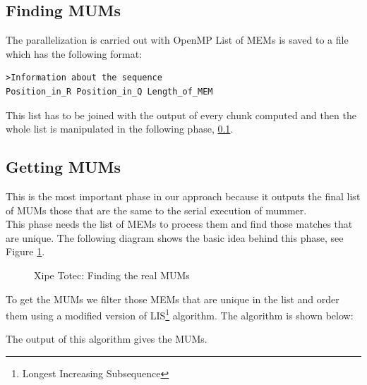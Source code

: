 \documentclass[3p,times]{elsarticle}
\begin{document}
\subsection*{Finding MUMs}
The parallelization is carried out with OpenMP 
List of MEMs is saved to a file which has the following format:
\begin{verbatim}
>Information about the sequence
Position_in_R Position_in_Q Length_of_MEM
\end{verbatim}
This list has to be joined with the output of every chunk computed and then the whole list is  manipulated in the following phase, \ref{getting}.
\subsection{Getting MUMs}
\label{getting}
This is the most important phase in our approach because it outputs the final list of MUMs those that are the same to the serial execution of mummer.\\
This phase needs the list of MEMs to process them and find those matches that are unique. The following diagram shows the basic idea behind this phase, see Figure \ref{xt}.
\begin{figure}[htb]  
 \begin{center} 
 \end{center} 
 \caption{Xipe Totec: Finding the real MUMs} 
   \label{xt} 
\end{figure}
To get the MUMs we filter those MEMs that are unique in the list and order them using a modified version of LIS\footnote{Longest Increasing Subsequence} algorithm.
The algorithm is shown below:
\begin{algorithmic}
\ELSE {}
\ENDIF
\ENDFOR
{}
\ELSE {}
\ENDIF
\ENDFOR
\end{algorithmic}
The output of this algorithm gives the MUMs.
\end{document}
